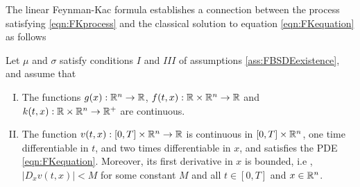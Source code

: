 The linear Feynman-Kac formula establishes a connection between the process satisfying \eqref{eqn:FKprocess} and the classical solution to equation \eqref{eqn:FKequation} as follows
\begin{comment}
	\begin{assumptions}
		\label{ass:FK}
		Let $\mu$ and $\sigma$ satisfy conditions $I$ and $III$ of assumptions \ref{ass:FBSDEexistence}, and 
		\begin{enumerate}[I.]
			\item The function $g(t,x):\bbR^n\to \bbR$ is continuous and there exist constants $L_g>0$ and $\lambda_g\geq 1$ such that $|g(x)|\leq L_g(1+|x|^{2\lambda_g})$ or $g(x)\geq 0$ for all $x\in \bbR^n$.
			\item The function $f(t,x):\bbR\times\bbR^n\to \bbR$ is continuous and there exist constants $L_f>0$ and $\lambda_f\geq 1$ such that $|f(t,x)|\leq L_f(1+|x|^{2\lambda_f})$ or $f(t,x)\geq 0$ for all $x\in \bbR^n$ and $t\in [0,T]$. 
			\item The function $k(t,x):\bbR\times \bbR^{n}\to \bbR^{+}$ is a continuous function bounded above, i.e, there exist a constant $\bar{k}>0$ such that $k(t,x)\leq \bar{k}$ for all $x\in \bbR^n$ and $t\in[0,T]$
			\item The function $v(t,x):[0,T]\times \bbR^n\to \bbR$ is continuous, one time differentiable in $t$, and two times differentiable in $x$, and satisfies the PDE \eqref{eqn:FKequation}, as well as a polynomial growth condition, i.e, there exist $L_v>0$ and $\lambda_v\geq 1$ such that  $\max_{0\leq t\leq T}|v(t,x)|\leq L_v(1+|x|^{2\lambda_v})$ for all $x\in\bbR^n$.
		\end{enumerate}
	\end{assumptions}
\end{comment}
\begin{assumptions}
	\label{ass:FK}
	Let $\mu$ and $\sigma$ satisfy conditions $I$ and $III$ of assumptions \ref{ass:FBSDEexistence}, and assume that
	\begin{enumerate}[I.]
		\item The functions $g(x):\mathbb{R}^n\to \mathbb{R}$, $f(t,x):\mathbb{R}\times\mathbb{R}^n\to \mathbb{R}$ and $k(t,x):\mathbb{R}\times \mathbb{R}^{n}\to \mathbb{R}^{+}$ are continuous. 
		\item The function $v(t,x):[0,T]\times \mathbb{R}^n\to \mathbb{R}$ is continuous in $[0,T]\times \mathbb{R}^{n}$, one time differentiable in $t$, and two times differentiable in $x$, and satisfies the PDE \eqref{eqn:FKequation}. Moreover, its first derivative in $x$ is bounded, i.e , $|D_x v(t,x)|<M$ for some constant $M$ and all $t\in[0,T]$ and $x\in\mathbb{R}^n$.
	\end{enumerate}
\end{assumptions}
